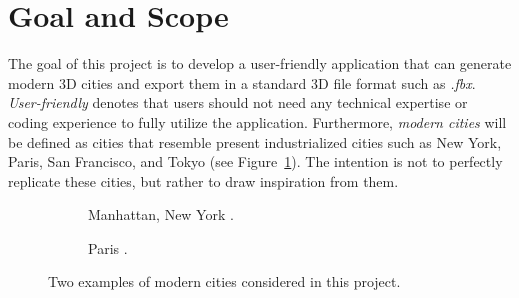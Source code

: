 \section{Goal and Scope}
\label{section:goal_and_scope}

The goal of this project is to develop a user-friendly application that can generate modern 3D cities and export them in a standard 3D file format such as \textit{.fbx}.
\textit{User-friendly} denotes that users should not need any technical expertise or coding experience to fully utilize the application.
Furthermore, \textit{modern cities} will be defined as cities that resemble present industrialized cities such as New York, Paris, San Francisco, and Tokyo (see Figure~\ref{fig:ModernCities}).
The intention is not to perfectly replicate these cities, but rather to draw inspiration from them.

\begin{figure}[h!]
  \centering

  \begin{subfigure}[b]{0.56\textwidth}
    \caption{Manhattan, New York \cite{manhattan_img}.}
  \end{subfigure}
  \quad
  \begin{subfigure}[b]{0.395\textwidth}
    \caption{Paris \cite{paris_img}.}
  \end{subfigure}

  \caption{Two examples of modern cities considered in this project.}
  \label{fig:ModernCities}
\end{figure}

